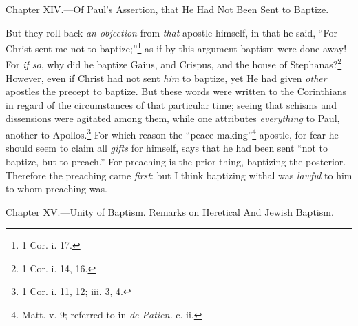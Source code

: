 
Chapter XIV.—Of Paul’s Assertion, that He Had Not Been Sent to Baptize.

But they roll back \emph{an objection} from \emph{that} apostle himself, in that he said, “For Christ sent me not to baptize;”\footnote{1 Cor. i. 17.} as if by this argument baptism were done away! For \emph{if so}, why did he baptize Gaius, and Crispus, and the house of Stephanas?\footnote{1 Cor. i. 14, 16.} However, even if Christ had not sent \emph{him} to baptize, yet He had given \emph{other} apostles the precept to baptize. But these words were written to the Corinthians in regard of the circumstances of that particular time; seeing that schisms and dissensions were agitated among them, while one attributes \emph{everything} to Paul, another to Apollos.\footnote{1 Cor. i. 11, 12; iii. 3, 4.} For which reason the “peace-making”\footnote{Matt. v. 9; referred to in \emph{de Patien.} c. ii.} apostle, for fear he should seem to claim all \emph{gifts} for himself, says that he had been sent “not to baptize, but to preach.” For preaching is the prior thing, baptizing the posterior. Therefore the preaching came \emph{first}: but I think baptizing withal was \emph{lawful} to him to whom preaching was.


Chapter XV.—Unity of Baptism. Remarks on Heretical And Jewish Baptism.

